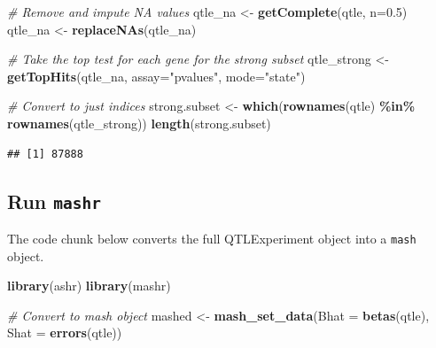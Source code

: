 \documentclass[
]{article}
\newenvironment{Shaded}{\begin{snugshade}}{\end{snugshade}}
\newcommand{\AttributeTok}[1]{\textcolor[rgb]{0.13,0.29,0.53}{#1}}
\newcommand{\CommentTok}[1]{\textcolor[rgb]{0.56,0.35,0.01}{\textit{#1}}}
\newcommand{\FloatTok}[1]{\textcolor[rgb]{0.00,0.00,0.81}{#1}}
\newcommand{\FunctionTok}[1]{\textcolor[rgb]{0.13,0.29,0.53}{\textbf{#1}}}
\newcommand{\NormalTok}[1]{#1}
\newcommand{\OtherTok}[1]{\textcolor[rgb]{0.56,0.35,0.01}{#1}}
\newcommand{\SpecialCharTok}[1]{\textcolor[rgb]{0.81,0.36,0.00}{\textbf{#1}}}
\newcommand{\StringTok}[1]{\textcolor[rgb]{0.31,0.60,0.02}{#1}}
\begin{document}
\footnotesize

\begin{Shaded}
\begin{Highlighting}[]
\CommentTok{\# Remove and impute NA values}
\NormalTok{qtle\_na }\OtherTok{\textless{}{-}} \FunctionTok{getComplete}\NormalTok{(qtle, }\AttributeTok{n=}\FloatTok{0.5}\NormalTok{)}
\NormalTok{qtle\_na }\OtherTok{\textless{}{-}} \FunctionTok{replaceNAs}\NormalTok{(qtle\_na)}

\CommentTok{\# Take the top test for each gene for the \textquotesingle{}strong\textquotesingle{} subset}
\NormalTok{qtle\_strong }\OtherTok{\textless{}{-}} \FunctionTok{getTopHits}\NormalTok{(qtle\_na, }\AttributeTok{assay=}\StringTok{"pvalues"}\NormalTok{, }\AttributeTok{mode=}\StringTok{"state"}\NormalTok{)}

\CommentTok{\# Convert to just indices}
\NormalTok{strong.subset }\OtherTok{\textless{}{-}} \FunctionTok{which}\NormalTok{(}\FunctionTok{rownames}\NormalTok{(qtle) }\SpecialCharTok{\%in\%} \FunctionTok{rownames}\NormalTok{(qtle\_strong))}
\FunctionTok{length}\NormalTok{(strong.subset)}
\end{Highlighting}
\end{Shaded}

\begin{verbatim}
## [1] 87888
\end{verbatim}

\normalsize

\hypertarget{run-mashr}{%
\subsection{\texorpdfstring{Run
\texttt{mashr}}{Run mashr}}\label{run-mashr}}

The code chunk below converts the full QTLExperiment object into a
\texttt{mash} object.

\footnotesize

\begin{Shaded}
\begin{Highlighting}[]
\FunctionTok{library}\NormalTok{(ashr)}
\FunctionTok{library}\NormalTok{(mashr)}

\CommentTok{\# Convert to mash object}
\NormalTok{mashed }\OtherTok{\textless{}{-}} \FunctionTok{mash\_set\_data}\NormalTok{(}\AttributeTok{Bhat =} \FunctionTok{betas}\NormalTok{(qtle), }\AttributeTok{Shat =} \FunctionTok{errors}\NormalTok{(qtle))}
\end{Highlighting}
\end{Shaded}
\end{document}
